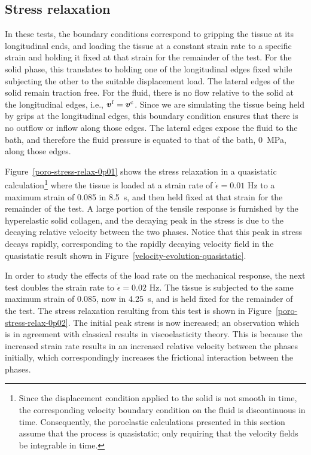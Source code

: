 \subsection{Stress relaxation}
\label{stress-relaxation}

In these tests, the boundary conditions correspond to gripping the
tissue at its longitudinal ends, and loading the tissue at a constant
strain rate to a specific strain and holding it fixed at that strain
for the remainder of the test. For the solid phase, this translates to
holding one of the longitudinal edges fixed while subjecting the other
to the suitable displacement load. The lateral edges of the solid
remain traction free. For the fluid, there is no flow relative to the
solid at the longitudinal edges, i.e., $\mbox{\boldmath$ v$}^{\mathrm{f}} =
\mbox{\boldmath$ v$}^{\mathrm{c}}$. Since we are simulating the tissue being held by
grips at the longitudinal edges, this boundary condition ensures that
there is no outflow or inflow along those edges. The lateral edges
expose the fluid to the bath, and therefore the fluid pressure is
equated to that of the bath, 0~MPa, along those edges.

Figure~\ref{poro-stress-relax-0p01} shows the stress relaxation in a
quasistatic calculation\footnote{Since the displacement condition
  applied to the solid is not smooth in time, the corresponding
  velocity boundary condition on the fluid is discontinuous in
  time. Consequently, the poroelastic calculations presented in this
  section assume that the process is quasistatic; only requiring that
  the velocity fields be integrable in time.}  where the tissue is
loaded at a strain rate of $\dot{\epsilon}=0.01$ Hz to a maximum
strain of 0.085 in 8.5~s, and then held fixed at that strain for the
remainder of the test. A large portion of the tensile response is
furnished by the hyperelastic solid collagen, and the decaying peak in
the stress is due to the decaying relative velocity between the two
phases. Notice that this peak in stress decays rapidly, corresponding
to the rapidly decaying velocity field in the quasistatic result shown
in Figure~\ref{velocity-evolution-quasistatic}.

In order to study the effects of the load rate on the mechanical
response, the next test doubles the strain rate to $\dot{\epsilon} =
0.02$ Hz. The tissue is subjected to the same maximum strain of 0.085,
now in 4.25~s, and is held fixed for the remainder of the test. The
stress relaxation resulting from this test is shown in
Figure~\ref{poro-stress-relax-0p02}. The initial peak stress is now
increased; an observation which is in agreement with classical results
in viscoelasticity theory. This is because the increased strain rate
results in an increased relative velocity between the phases
initially, which correspondingly increases the frictional interaction
between the phases.

